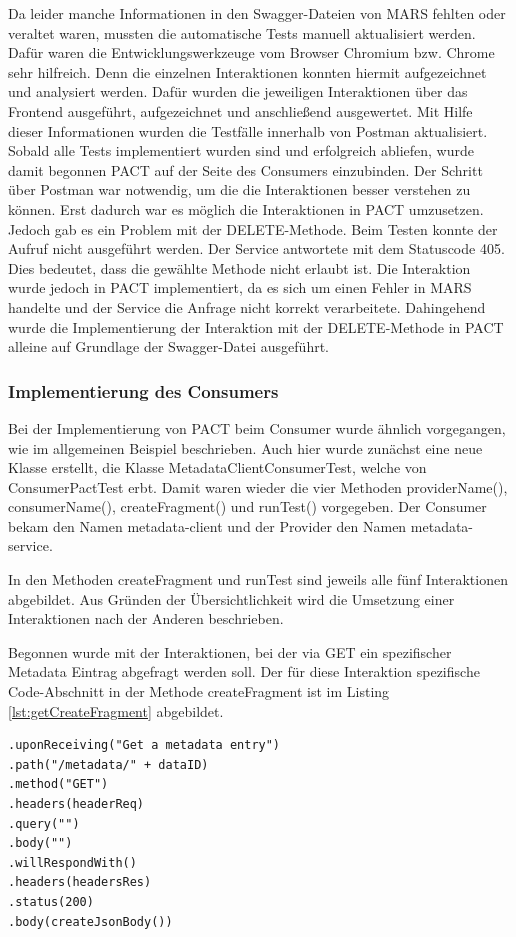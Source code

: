 \documentclass{llncs}
\begin{document}
Da leider manche Informationen in den Swagger-Dateien von MARS fehlten oder veraltet waren, mussten die automatische Tests manuell aktualisiert werden. Dafür waren die Entwicklungswerkzeuge vom Browser Chromium bzw. Chrome sehr hilfreich. Denn die einzelnen Interaktionen konnten hiermit aufgezeichnet und analysiert werden. Dafür wurden die jeweiligen Interaktionen über das Frontend ausgeführt, aufgezeichnet und anschließend ausgewertet. Mit Hilfe dieser Informationen wurden die Testfälle innerhalb von Postman aktualisiert. Sobald alle Tests implementiert wurden sind und erfolgreich abliefen, wurde damit begonnen PACT auf der Seite des Consumers einzubinden. Der Schritt über Postman war notwendig, um die die Interaktionen besser verstehen zu können. Erst dadurch war es möglich die Interaktionen in PACT umzusetzen. Jedoch gab es ein Problem mit der DELETE-Methode. Beim Testen konnte der Aufruf nicht ausgeführt werden. Der Service antwortete mit dem Statuscode 405. Dies bedeutet, dass die gewählte Methode nicht erlaubt ist. Die Interaktion wurde jedoch in PACT implementiert, da es sich um einen Fehler in MARS handelte und der Service die Anfrage nicht korrekt verarbeitete. Dahingehend wurde die Implementierung der Interaktion mit der DELETE-Methode in PACT alleine auf Grundlage der Swagger-Datei ausgeführt.

\subsubsection{Implementierung des Consumers}
Bei der Implementierung von PACT beim Consumer wurde ähnlich vorgegangen, wie im allgemeinen Beispiel beschrieben. Auch hier wurde zunächst eine neue Klasse erstellt, die Klasse MetadataClientConsumerTest, welche von ConsumerPactTest erbt. Damit waren wieder die vier Methoden providerName(), consumerName(), createFragment() und runTest() vorgegeben. Der Consumer bekam den Namen metadata-client und der Provider den Namen metadata-service. 

In den Methoden createFragment und runTest sind jeweils alle fünf Interaktionen abgebildet. Aus Gründen der Übersichtlichkeit wird die Umsetzung einer Interaktionen nach der Anderen beschrieben.

Begonnen wurde mit der Interaktionen, bei der via GET ein spezifischer Metadata Eintrag abgefragt werden soll.
Der für diese Interaktion spezifische Code-Abschnitt in der Methode createFragment ist im Listing \ref{lst:getCreateFragment} abgebildet.

\lstset{language = Java}
\begin{lstlisting}[caption=createFragment für die GET-Methode,label=lst:getCreateFragment]
.uponReceiving("Get a metadata entry")
.path("/metadata/" + dataID)
.method("GET")
.headers(headerReq)
.query("")
.body("")
.willRespondWith()
.headers(headersRes)
.status(200)
.body(createJsonBody())
\end{lstlisting}
\end{document}
